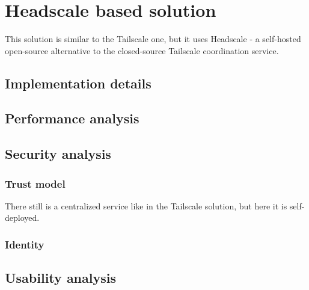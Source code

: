 \hypertarget{headscale-based-solution}{%
\chapter{Headscale based solution}\label{headscale-based-solution}}

This solution is similar to the Tailscale one, but it uses Headscale - a
self-hosted open-source alternative to the closed-source Tailscale
coordination service.

\hypertarget{implementation-details}{%
\section{Implementation details}\label{implementation-details}}

\hypertarget{performance-analysis}{%
\section{Performance analysis}\label{performance-analysis}}

\hypertarget{security-analysis}{%
\section{Security analysis}\label{security-analysis}}

\hypertarget{trust-model}{%
\subsection{Trust model}\label{trust-model}}

There still is a centralized service like in the Tailscale solution, but
here it is self-deployed.

\hypertarget{identity}{%
\subsection{Identity}\label{identity}}

\hypertarget{usability-analysis}{%
\section{Usability analysis}\label{usability-analysis}}
